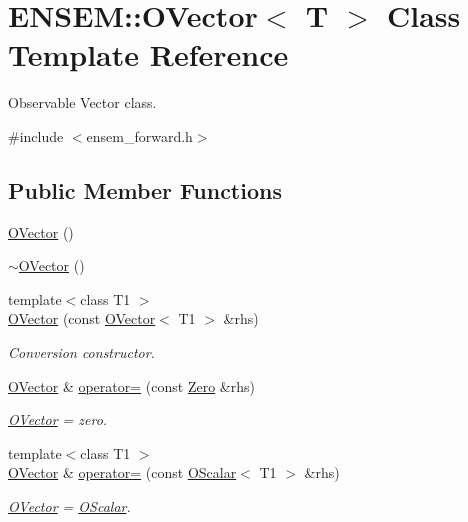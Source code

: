 \hypertarget{classENSEM_1_1OVector}{}\section{E\+N\+S\+EM\+:\+:O\+Vector$<$ T $>$ Class Template Reference}
\label{classENSEM_1_1OVector}


Observable Vector class.  




{\ttfamily \#include $<$ensem\+\_\+forward.\+h$>$}

\subsection*{Public Member Functions}
\begin{DoxyCompactItemize}
\item 
\mbox{\hyperlink{classENSEM_1_1OVector_a49c6719652aea7b411f9ce1e5aa38b18}{O\+Vector}} ()
\item 
\mbox{\hyperlink{classENSEM_1_1OVector_adce03257e8042e3ba68c15f88148a83a}{$\sim$\+O\+Vector}} ()
\item 
{\footnotesize template$<$class T1 $>$ }\\\mbox{\hyperlink{classENSEM_1_1OVector_a1d68ef86b31297a79368789f7a0e43bc}{O\+Vector}} (const \mbox{\hyperlink{classENSEM_1_1OVector}{O\+Vector}}$<$ T1 $>$ \&rhs)
\begin{DoxyCompactList}\small\item\em Conversion constructor. \end{DoxyCompactList}\item 
\mbox{\hyperlink{classENSEM_1_1OVector}{O\+Vector}} \& \mbox{\hyperlink{classENSEM_1_1OVector_a54123bea722ddb2b3eaea0c948735b13}{operator=}} (const \mbox{\hyperlink{structENSEM_1_1Zero}{Zero}} \&rhs)
\begin{DoxyCompactList}\small\item\em \mbox{\hyperlink{classENSEM_1_1OVector}{O\+Vector}} = zero. \end{DoxyCompactList}\item 
{\footnotesize template$<$class T1 $>$ }\\\mbox{\hyperlink{classENSEM_1_1OVector}{O\+Vector}} \& \mbox{\hyperlink{classENSEM_1_1OVector_a31b08dda73879d2a39c4a0bec90bc401}{operator=}} (const \mbox{\hyperlink{classENSEM_1_1OScalar}{O\+Scalar}}$<$ T1 $>$ \&rhs)
\begin{DoxyCompactList}\small\item\em \mbox{\hyperlink{classENSEM_1_1OVector}{O\+Vector}} = \mbox{\hyperlink{classENSEM_1_1OScalar}{O\+Scalar}}. \end{DoxyCompactList}\item 

\end{DoxyCompactItemize}
